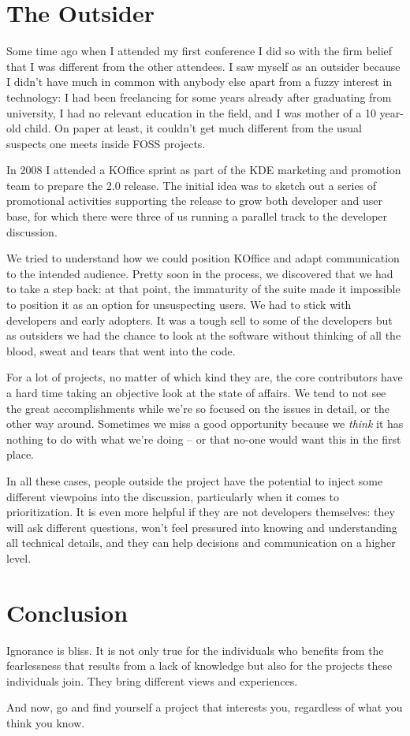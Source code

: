 \section{The Outsider}

Some time ago when I attended my first conference I did so with the firm belief that I was different from the other attendees. I saw myself as an outsider because I didn't have much in common with anybody else apart from a fuzzy interest in technology: I had been freelancing for some years already after graduating from university, I had no relevant education in the field, and I was mother of a 10 year-old child. On paper at least, it couldn't get much different from the usual suspects one meets inside FOSS projects.

In 2008 I attended a KOffice sprint as part of the KDE marketing and promotion team to prepare the 2.0 release. The initial idea was to sketch out a series of promotional activities supporting the release to grow both developer and user base, for which there were three of us running a parallel track to the developer discussion.

We tried to understand how we could position KOffice and adapt communication to the intended audience. Pretty soon in the process, we discovered that we had to take a step back: at that point, the immaturity of the suite made it impossible to position it as an option for unsuspecting users. We had to stick with developers and early adopters. It was a tough sell to some of the developers but as outsiders we had the chance to look at the software without thinking of all the blood, sweat and tears that went into the code.

For a lot of projects, no matter of which kind they are, the core contributors have a hard time taking an objective look at the state of affairs. We tend to not see the great accomplishments while we're so focused on the issues in detail, or the other way around. Sometimes we miss a good opportunity because we \textit{think} it has nothing to do with what we're doing -- or that no-one would want this in the first place.

In all these cases, people outside the project have the potential to inject some different viewpoins into the discussion, particularly when it comes to prioritization. It is even more helpful if they are not developers themselves: they will ask different questions, won't feel pressured into knowing and understanding all technical details, and they can help decisions and communication on a higher level.

\section{Conclusion}

Ignorance is bliss. It is not only true for the individuals who benefits from the fearlessness that results from a lack of knowledge but also for the projects these individuals join. They bring different views and experiences.

And now, go and find yourself a project that interests you, regardless of what you think you know.